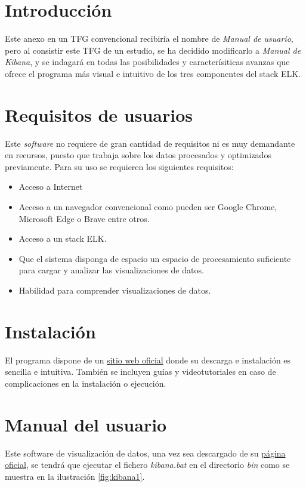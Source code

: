 
\section{Introducción}
Este anexo en un TFG convencional recibiría el nombre de \textit{Manual de usuario}, pero al consistir este TFG de un estudio, se ha decidido modificarlo a \textit{Manual de Kibana}, y se indagará en todas las posibilidades y caracterísiticas avanzas que ofrece el programa más visual e intuitivo de los tres componentes del stack ELK. 

\section{Requisitos de usuarios}
Este \textit{software} no requiere de gran cantidad de requisitos ni es muy demandante en recursos, puesto que trabaja sobre los datos procesados y optimizados previamente.
Para su uso se requieren los siguientes requisitos:
\begin{itemize}
    \item Acceso a Internet
    \item Acceso a un navegador convencional como pueden ser Google Chrome, Microsoft Edge o Brave entre otros.
    \item Acceso a un stack ELK.
    \item Que el sistema disponga de espacio un espacio de procesamiento suficiente para cargar y analizar las visualizaciones de datos.
    \item Habilidad para comprender visualizaciones de datos.
\end{itemize}

\section{Instalación}
El programa dispone de un \href{https://www.elastic.co/es/kibana}{sitio web oficial} donde su descarga e instalación es sencilla e intuitiva. También se incluyen guías y videotutoriales en caso de complicaciones en la instalación o ejecución.

\section{Manual del usuario}

Este software de visualización de datos, una vez sea descargado de su \href{https://www.elastic.co/es/kibana}{página oficial}, se tendrá que ejecutar el fichero \textit{kibana.bat} en el directorio \textit{bin} como se muestra en la ilustración \ref{fig:kibana1}. 

